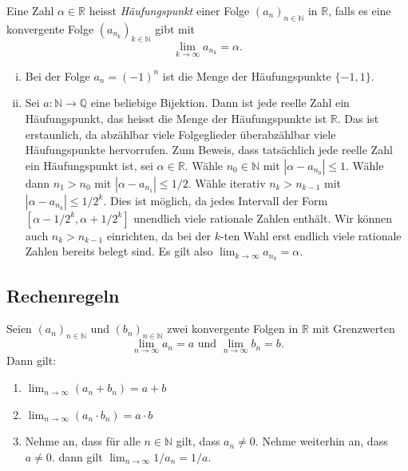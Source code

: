\documentclass[../main.tex]{subfiles}
\begin{document}
\begin{definition}
  Eine Zahl $\alpha \in \mathbb{R}$ heisst
  \emph{Häufungspunkt} einer Folge
  ${(a_{n})}_{n \in \mathbb{N}}$ in $\mathbb{R}$,
  falls es eine konvergente Folge
  ${(a_{n_k})}_{k \in \mathbb{N}}$ gibt
  mit
  \[
    \lim_{k \to \infty} a_{n_k} = \alpha.
  \]
\end{definition}

\begin{examples}
  \leavevmode
  \begin{enumerate}[(i)]
    \item Bei der Folge $a_n = (-1)^n$ ist die Menge
      der Häufungspunkte $\{-1, 1\}$.
    \item Sei $a \colon \mathbb{N} \to \mathbb{Q}$ eine
      beliebige
      Bijektion. Dann ist jede reelle Zahl ein Häufungspunkt,
      das heisst die Menge der Häufungspunkte
      ist $\mathbb{R}$. Das ist erstaunlich, da abzählbar
      viele Folgeglieder überabzählbar viele
      Häufungspunkte hervorrufen. Zum Beweis,
      dass tatsächlich jede reelle Zahl ein Häufungspunkt
      ist, sei $\alpha \in \mathbb{R}$. Wähle
      $n_0 \in \mathbb{N}$ mit $|\alpha - a_{n_0}| \leq 1$.
      Wähle dann $n_{1} > n_0$ mit $|\alpha - a_{n_1}| \leq 1/2$.
      Wähle iterativ $n_{k} > n_{k-1}$ mit $|\alpha - a_{n_k}|
      \leq 1/2^k$. Dies ist möglich, da jedes Intervall der
      Form
      $[\alpha - 1/2^k, \alpha + 1/2^k]$ unendlich viele
      rationale Zahlen enthält. Wir können auch $n_k > n_{k-1}$
      einrichten, da bei der $k$-ten Wahl erst endlich viele
      rationale Zahlen bereits belegt sind.
      Es gilt also
      \(
        \lim_{k \to \infty} a_{n_k} = \alpha.
      \)
  \end{enumerate}
\end{examples}


\subsection*{Rechenregeln}
\begin{proposition}
  Seien ${(a_n)}_{n \in \mathbb{N}}$ und
  ${(b_n)}_{n \in \mathbb{N}}$ zwei
  konvergente Folgen in $\mathbb{R}$ mit Grenzwerten
  \[
    \lim_{n \to \infty} a_n = a \text{ und }
    \lim_{n \to \infty} b_n = b.
  \]
  Dann gilt:
  \begin{enumerate}[\normalfont(i)]
    \item $\lim_{n \to \infty} (a_n + b_n) = a + b$ 
    \item $\lim_{n \to \infty} (a_n \cdot b_n) = a \cdot b$
    \item Nehme an, dass für alle $n \in \mathbb{N}$ gilt,
      dass $a_n \neq 0$. Nehme weiterhin an, dass $a \neq 0$.
      dann gilt
      \(
        \lim_{n \to \infty} {1}/{a_n} = {1}/{a}
      \).
  \end{enumerate}
\end{proposition}
\end{document}
